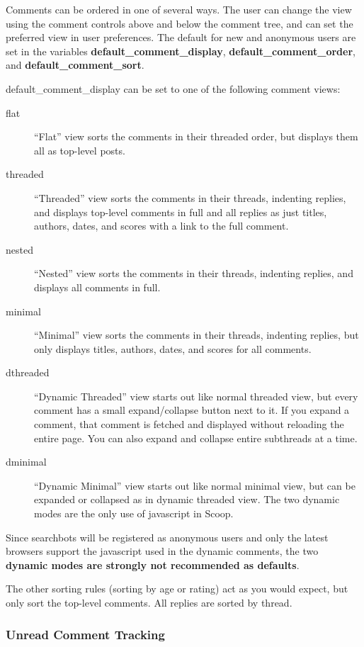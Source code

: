 Comments can be ordered in one of several ways.  The user can change the view using the comment controls above and below the comment tree, and can set the preferred view in user preferences.  The default for new and anonymous users are set in the variables {\bf default\_comment\_display}, {\bf default\_comment\_order}, and {\bf default\_comment\_sort}.

default\_comment\_display can be set to one of the following comment views:

\begin{description}
\item[flat] ``Flat'' view sorts the comments in their threaded order, but displays them all as top-level posts.
\item[threaded] ``Threaded'' view sorts the comments in their threads, indenting replies, and displays top-level comments in full and all replies as just titles, authors, dates, and scores with a link to the full comment.
\item[nested] ``Nested'' view sorts the comments in their threads, indenting replies, and displays all comments in full.
\item[minimal] ``Minimal'' view sorts the comments in their threads, indenting replies, but only displays titles, authors, dates, and scores for all comments.
\item[dthreaded] ``Dynamic Threaded'' view starts out like normal threaded view, but every comment has a small expand/collapse button next to it.  If you expand a comment, that comment is fetched and displayed without reloading the entire page.  You can also expand and collapse entire subthreads at a time.
\item[dminimal] ``Dynamic Minimal'' view starts out like normal minimal view, but can be expanded or collapsed as in dynamic threaded view.  The two dynamic modes are the only use of javascript in Scoop. 
\end{description}

Since searchbots will be registered as anonymous users and only the latest browsers support the javascript used in the dynamic comments, the two {\bf dynamic modes are strongly not recommended as defaults}.

The other sorting rules (sorting by age or rating) act as you would expect, but only sort the top-level comments.  All replies are sorted by thread.

\subsubsection{Unread Comment Tracking}
\label{comments-unread}

